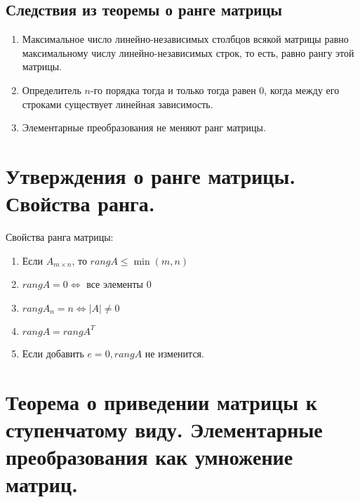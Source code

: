 \documentclass[12pt, fleqn]{article}
\begin{document}
\subsection*{Следствия из теоремы о ранге матрицы}
\begin{enumerate}
	\item Максимальное число линейно-независимых столбцов всякой матрицы равно максимальному числу линейно-независимых строк, то есть, равно рангу этой матрицы.
	\item Определитель $n$-го порядка тогда и только тогда равен 0, когда между его строками существует линейная зависимость.
	\item Элементарные преобразования не меняют ранг матрицы.
\end{enumerate}
\section{Утверждения о ранге матрицы. Свойства ранга.}
Свойства ранга матрицы:
\begin{enumerate}
	\item Если $A_{m\times n}$, то $rang A \leq \min(m,n)$
	\item $rang A = 0 \Leftrightarrow $ все элементы $0$
	\item $rang A_n=n \Leftrightarrow \left|A\right|\neq0$
	\item $rang A = rang A^T$
	\item Если добавить $e=0, rang A$ не изменится.
\end{enumerate}
\section{Теорема о приведении матрицы к ступенчатому виду. Элементарные преобразования как умножение матриц.}
\end{document}
